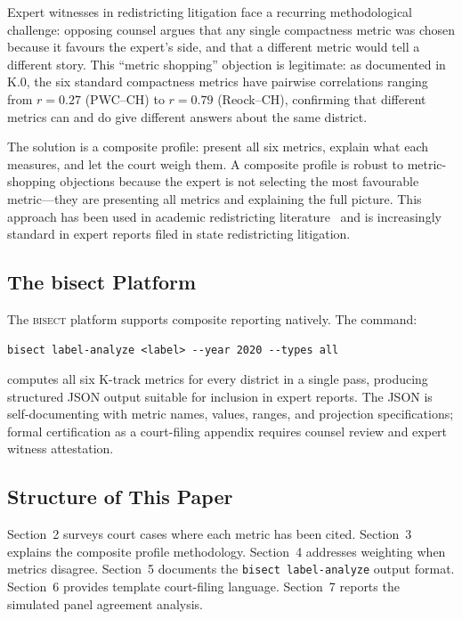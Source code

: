Expert witnesses in redistricting litigation face a recurring methodological
challenge: opposing counsel argues that any single compactness metric was
chosen because it favours the expert's side, and that a different metric
would tell a different story.
This ``metric shopping'' objection is legitimate: as documented in K.0,
the six standard compactness metrics have pairwise correlations ranging from
$r = 0.27$ (PWC--CH) to $r = 0.79$ (Reock--CH), confirming that different
metrics can and do give different answers about the same district.

The solution is a composite profile: present all six metrics, explain
what each measures, and let the court weigh them.
A composite profile is robust to metric-shopping objections because the expert
is not selecting the most favourable metric---they are presenting all metrics
and explaining the full picture.
This approach has been used in academic redistricting literature~\citep{niemi1990measuring}
and is increasingly standard in expert reports filed in state redistricting litigation.

\subsection{The bisect Platform}

The \textsc{bisect} platform supports composite reporting natively.
The command:
\begin{verbatim}
bisect label-analyze <label> --year 2020 --types all
\end{verbatim}
computes all six K-track metrics for every district in a single pass,
producing structured JSON output suitable for inclusion in expert reports.
The JSON is self-documenting with metric names, values, ranges, and projection
specifications; formal certification as a court-filing appendix requires counsel
review and expert witness attestation.

\subsection{Structure of This Paper}

Section~2 surveys court cases where each metric has been cited.
Section~3 explains the composite profile methodology.
Section~4 addresses weighting when metrics disagree.
Section~5 documents the \texttt{bisect label-analyze} output format.
Section~6 provides template court-filing language.
Section~7 reports the simulated panel agreement analysis.
